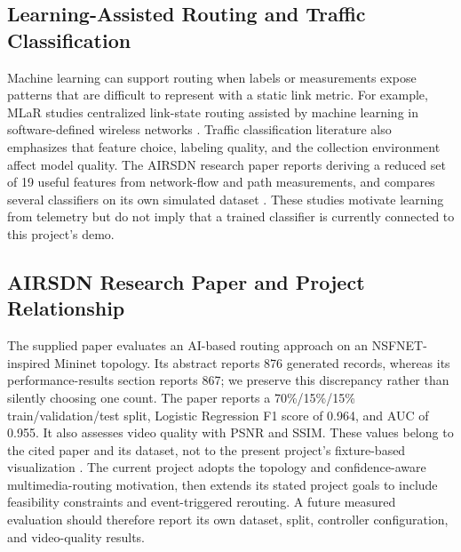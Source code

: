 \documentclass[conference]{IEEEtran}
\begin{document}
\subsection{Learning-Assisted Routing and Traffic Classification}
Machine learning can support routing when labels or measurements expose patterns that are difficult to represent with a static link metric. For example, MLaR studies centralized link-state routing assisted by machine learning in software-defined wireless networks \cite{cicioglu2023mlar}. Traffic classification literature also emphasizes that feature choice, labeling quality, and the collection environment affect model quality. The AIRSDN research paper reports deriving a reduced set of 19 useful features from network-flow and path measurements, and compares several classifiers on its own simulated dataset \cite{ipek2025airsdn}. These studies motivate learning from telemetry but do not imply that a trained classifier is currently connected to this project's demo.

\subsection{AIRSDN Research Paper and Project Relationship}
The supplied paper evaluates an AI-based routing approach on an NSFNET-inspired Mininet topology. Its abstract reports 876 generated records, whereas its performance-results section reports 867; we preserve this discrepancy rather than silently choosing one count. The paper reports a 70\%/15\%/15\% train/validation/test split, Logistic Regression F1 score of 0.964, and AUC of 0.955. It also assesses video quality with PSNR and SSIM. These values belong to the cited paper and its dataset, not to the present project's fixture-based visualization \cite{ipek2025airsdn}. The current project adopts the topology and confidence-aware multimedia-routing motivation, then extends its stated project goals to include feasibility constraints and event-triggered rerouting. A future measured evaluation should therefore report its own dataset, split, controller configuration, and video-quality results.
\end{document}
